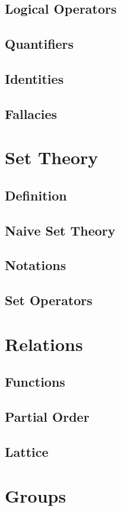 \documentclass{book}
\begin{document}
\subsection {Logical Operators}
\subsection {Quantifiers}
\subsection {Identities}
\subsection {Fallacies}

\section {Set Theory}
\subsection{Definition}
\subsection{Naive Set Theory}
\subsection{Notations}
\subsection{Set Operators}

\section{Relations}
\subsection{Functions}
\subsection{Partial Order}
\subsection{Lattice}

\section{Groups}
\end{document}
